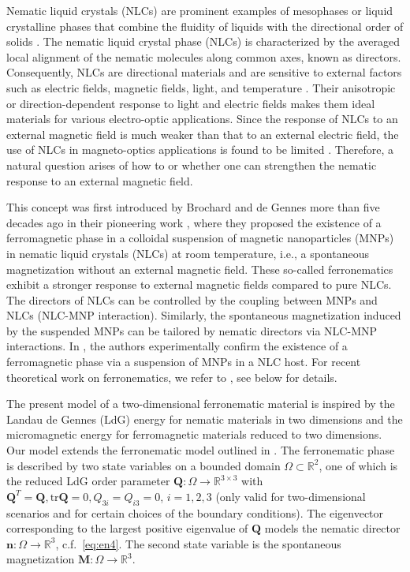 \documentclass{article}
\def\Qvec{\mathbf{Q}}
\def \Mvec{\mathbf{M}}
\def\nvec{\mathbf{n}}
\begin{document}
Nematic liquid crystals (NLCs) are prominent examples of mesophases or liquid crystalline phases that combine the fluidity of liquids with the directional order of solids \cite{Gennes}. The nematic liquid crystal phase (NLCs) is characterized by the averaged local alignment of the nematic molecules along common axes, known as directors. Consequently, NLCs are directional materials and are sensitive to external factors such as electric fields, magnetic fields, light, and temperature \cite{lagerwall2012new}. Their anisotropic or direction-dependent response to light and electric fields makes them ideal materials for various electro-optic applications. Since the response of NLCs to an external magnetic field is much weaker than that to an external electric field, the use of NLCs in magneto-optics applications is found to be limited \cite{Shui}. Therefore, a natural question arises of how to or whether one can strengthen the nematic response to an external magnetic field.

This concept was first introduced by Brochard and de Gennes more than five decades ago in their pioneering work \cite{brochard1970theory}, where they proposed the existence of a ferromagnetic phase in a colloidal suspension of magnetic nanoparticles (MNPs) in nematic liquid crystals (NLCs) at room temperature, i.e., a spontaneous magnetization without an external magnetic field. These so-called ferronematics exhibit a stronger response to external magnetic fields compared to pure NLCs. The directors of NLCs can be controlled by the coupling between MNPs and NLCs (NLC-MNP interaction). Similarly, the spontaneous magnetization induced by the suspended MNPs can be tailored by nematic directors via NLC-MNP interactions. In \cite{chen1983observation, Mertelj}, the authors experimentally confirm the existence of a ferromagnetic phase via a suspension of MNPs in a NLC host. For recent theoretical work on ferronematics, we refer to \cite{Bisht2020, Canevari2025, Canevari, Dalby, maity2021parameter}, see below for details.

The present model of a two-dimensional ferronematic material is inspired by the Landau de Gennes (LdG) energy for nematic materials in two dimensions \cite{Gennes, han2020reduced} and the micromagnetic energy for ferromagnetic materials reduced to two dimensions.   Our model extends the ferronematic model outlined in \cite{Bisht2020}. The ferronematic phase is described by two state variables on a bounded domain $\Omega \subset \mathbb{R}^2$, one of which is the reduced LdG order parameter $\Qvec: \Omega\rightarrow\mathbb{R}^{3\times 3}$ with $\Qvec^T=\Qvec, \mathrm{tr}{\Qvec}=0, Q_{3i}=Q_{i3}=0$, $i=1,2,3$ (only valid for two-dimensional scenarios and for certain choices of the boundary conditions). The eigenvector corresponding to the largest positive eigenvalue of $\Qvec$ models the nematic director $\nvec:\Omega\to\mathbb{R}^3$, c.f.\ \eqref{eq:en4}. The second state variable is the spontaneous magnetization $\Mvec: \Omega\rightarrow\mathbb{R}^3$. 
\end{document}
